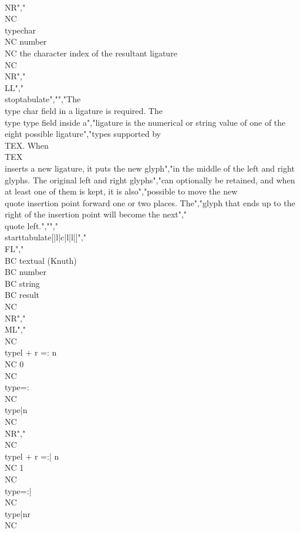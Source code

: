 \\NR","\\NC \\type{char} \\NC number \\NC the character index of the resultant ligature \\NC \\NR","\\LL","\\stoptabulate","","The \\type {char} field in a ligature is required. The \\type {type} field inside a","ligature is the numerical or string value of one of the eight possible ligature","types supported by \\TEX. When \\TEX\\ inserts a new ligature, it puts the new glyph","in the middle of the left and right glyphs. The original left and right glyphs","can optionally be retained, and when at least one of them is kept, it is also","possible to move the new \\quote {insertion point} forward one or two places. The","glyph that ends up to the right of the insertion point will become the next","\\quote {left}.","","\\starttabulate[|l|c|l|l|]","\\FL","\\BC textual (Knuth)       \\BC number \\BC string        \\BC result      \\NC \\NR","\\ML","\\NC \\type{l + r =: n}     \\NC 0      \\NC \\type{=:}     \\NC \\type{|n}   \\NC \\NR","\\NC \\type{l + r =:| n}    \\NC 1      \\NC \\type{=:|}    \\NC \\type{|nr}  \\NC 